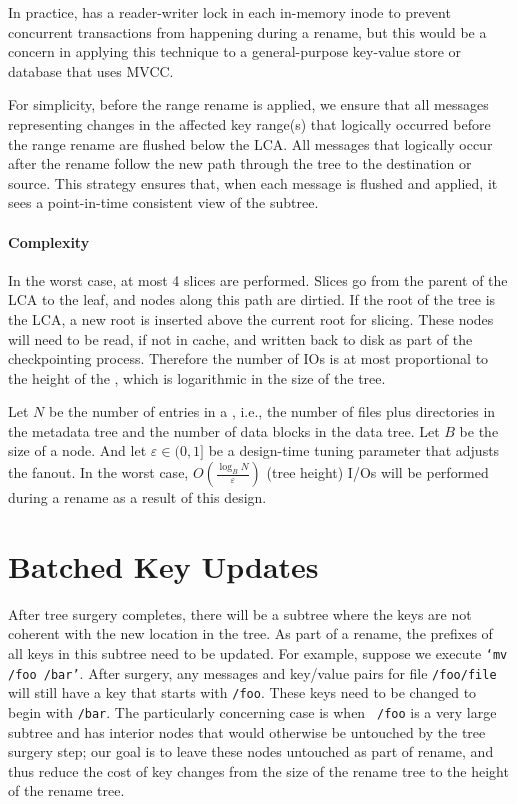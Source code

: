 In practice, \betrfs has a reader-writer lock in each in-memory inode to prevent
concurrent transactions from happening during a rename,
but this would be a concern in applying this technique to a general-purpose
key-value store or database that uses MVCC.

For simplicity, before the range rename is applied, we ensure that all messages
representing changes in the affected key range(s) that logically occurred before
the range rename are flushed below the LCA.
All messages that logically occur after the rename follow the new path through
the tree to the destination or source.
This strategy ensures that, when each message is flushed and applied, it sees a
point-in-time consistent view of the subtree.

\paragraph{Complexity} In the worst case, at most 4 slices are performed.
Slices go from the parent of the LCA to the leaf,
and nodes along this path are dirtied.
If the root of the tree is the LCA, a new root is inserted above the current
root for slicing.
These nodes will need to be read, if not in cache,
and written back to disk as part of the checkpointing process.
Therefore the number of IOs is at most proportional to the height of the \bet,
which is logarithmic in the size of the tree.

Let $N$ be the number of entries in a \bet, i.e., the number of files plus
directories in the metadata tree and the number of data blocks in the data tree.
Let $B$ be the size of a node.
And let $\varepsilon\in(0,1]$ be a design-time tuning parameter that adjusts the
fanout.
In the worst case, $O(\frac{\log_B{N}}{\varepsilon})$ (tree height)
I/Os will be performed  during a rename as a result of this design.

\section{Batched Key Updates}

After tree surgery completes, there will be a subtree where the keys
are not coherent with the new location in the tree.  As part of a
rename, the prefixes of all keys in this subtree need to be updated.
For example, suppose we execute \texttt{`mv /foo /bar'}.  After surgery,
any messages and
key/value pairs for file \texttt{/foo/file} will still have a key that
starts with \texttt{/foo}.  These keys need to be changed to begin
with \texttt{/bar}.  The particularly concerning case is when {\tt
  /foo} is a very large subtree and has interior nodes that would
otherwise be untouched by the tree surgery step; our goal is to leave
these nodes untouched as part of rename, and thus reduce the cost of
key changes from the size of the rename tree to the height of the
rename tree.

